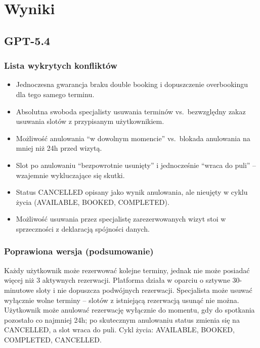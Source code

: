 \documentclass[12pt,a4paper]{article}
\begin{document}
\begin{mdframed}[backgroundcolor=metabg, linewidth=0pt, innerleftmargin=10pt, innerrightmargin=10pt, innertopmargin=8pt, innerbottommargin=8pt]
\end{mdframed}

\section{Wyniki}

\subsection{\textcolor{gptcolor}{GPT-5.4} }

\subsubsection{Lista wykrytych konfliktów}
\begin{itemize}[leftmargin=1.5em, itemsep=2pt]
  \item Jednoczesna gwarancja braku double booking i dopuszczenie overbookingu dla tego samego terminu.
  \item Absolutna swoboda specjalisty usuwania terminów vs.\ bezwzględny zakaz usuwania slotów z przypisanym użytkownikiem.
  \item Możliwość anulowania ``w dowolnym momencie'' vs.\ blokada anulowania na mniej niż 24h przed wizytą.
  \item Slot po anulowaniu ``bezpowrotnie usunięty'' i jednocześnie ``wraca do puli'' -- wzajemnie wykluczające się skutki.
  \item Status CANCELLED opisany jako wynik anulowania, ale nieujęty w cyklu życia (AVAILABLE, BOOKED, COMPLETED).
  \item Możliwość usuwania przez specjalistę zarezerwowanych wizyt stoi w sprzeczności z deklaracją spójności danych.
\end{itemize}

\subsubsection{Poprawiona wersja (podsumowanie)}
\small
Każdy użytkownik może rezerwować kolejne terminy, jednak nie może posiadać więcej niż 3 aktywnych rezerwacji. Platforma działa w oparciu o sztywne 30-minutowe sloty i nie dopuszcza podwójnych rezerwacji. Specjalista może usuwać wyłącznie wolne terminy -- slotów z istniejącą rezerwacją usunąć nie można. Użytkownik może anulować rezerwację wyłącznie do momentu, gdy do spotkania pozostało co najmniej 24h; po skutecznym anulowaniu status zmienia się na CANCELLED, a slot wraca do puli. Cykl życia: AVAILABLE, BOOKED, COMPLETED, CANCELLED.
\normalsize
\end{document}
